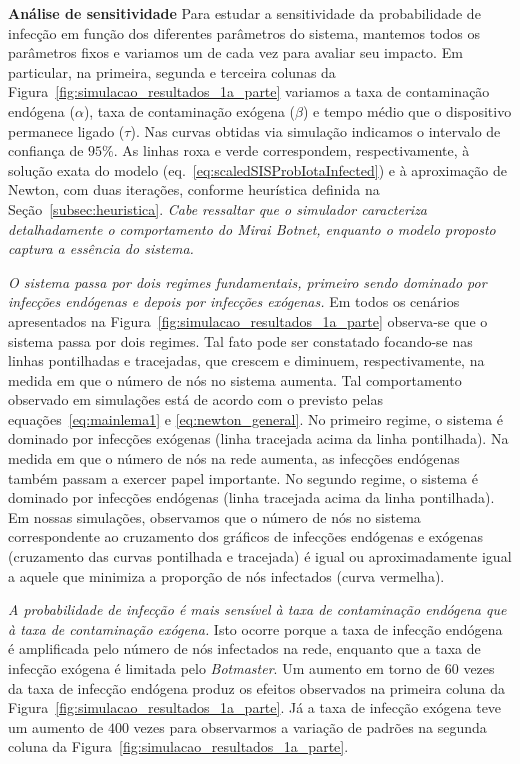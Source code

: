 	    
	    \textbf{Análise de sensitividade} Para estudar a sensitividade da probabilidade de infecção em função dos diferentes parâmetros do sistema, mantemos todos os parâmetros fixos e variamos um de cada vez para avaliar seu impacto.   Em particular, na primeira, segunda e terceira colunas da Figura~\ref{fig:simulacao_resultados_1a_parte} variamos a taxa de contaminação endógena ($\alpha$), taxa de contaminação exógena ($\beta$) e tempo médio que o dispositivo permanece ligado ($\tau$). Nas curvas obtidas via simulação indicamos o intervalo de confiança de $95\%$.   As linhas roxa e verde correspondem, respectivamente, à solução exata do modelo (eq.~\eqref{eq:scaledSISProbIotaInfected}) e à aproximação de Newton, com duas iterações, conforme  heurística definida na Seção~\ref{subsec:heuristica}. 
	     \emph{Cabe ressaltar que o simulador caracteriza detalhadamente o  comportamento do \textit{Mirai Botnet}, enquanto  o modelo proposto  captura a essência do  sistema.}
	    
\emph{O sistema passa por dois regimes fundamentais, primeiro sendo dominado por infecções endógenas e depois por infecções exógenas. }	    Em todos os cenários apresentados na Figura~\ref{fig:simulacao_resultados_1a_parte} observa-se  que o sistema passa por dois regimes.  Tal fato pode ser constatado focando-se nas linhas pontilhadas e tracejadas, que crescem e diminuem, respectivamente,  na medida em que o número de nós no sistema aumenta.   Tal comportamento observado em simulações está de acordo com o previsto pelas equações~\eqref{eq:mainlema1} e \eqref{eq:newton_general}.  No primeiro regime, o sistema é dominado por infecções exógenas (linha tracejada  acima da linha pontilhada).  Na medida em que o número de nós na rede aumenta, as infecções endógenas também passam a exercer papel  importante.  No segundo regime, o sistema é dominado por infecções endógenas (linha tracejada  acima da linha pontilhada).  Em nossas simulações, observamos que o número de nós no sistema correspondente ao cruzamento dos gráficos de infecções endógenas e exógenas (cruzamento das curvas pontilhada e tracejada) é igual ou aproximadamente igual  a aquele que minimiza a  proporção de nós infectados (curva vermelha).
	    
	    
	    
\emph{A probabilidade de infecção é mais sensível à taxa de contaminação endógena  que à taxa de contaminação exógena. } Isto ocorre porque a taxa de infecção endógena é amplificada pelo número de nós infectados na rede, enquanto que a taxa de infecção exógena é limitada pelo \emph{Botmaster}.  Um aumento em torno de $60$ vezes da taxa de infecção endógena produz os efeitos observados na primeira coluna da Figura~\ref{fig:simulacao_resultados_1a_parte}.  Já  a taxa de infecção exógena teve um aumento de $400$ vezes para observarmos a variação de  padrões na segunda coluna da  Figura~\ref{fig:simulacao_resultados_1a_parte}.
	    

